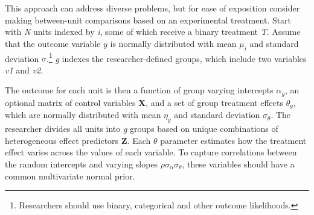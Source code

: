\documentclass[12pt]{article}
\begin{document}
This approach can address diverse problems, but for ease of exposition consider making between-unit comparisons based on an experimental treatment.    
Start with \textit{N} units indexed by \textit{i}, some of which receive a binary treatment \textit{T}.
Assume that the outcome variable ${y}$ is normally distributed with mean $\mu_i$ and standard deviation $\sigma$.\footnote{Researchers should use binary, categorical and other outcome likelihoods.}
\textit{g} indexes the researcher-defined groups, which include two variables \textit{v1} and \textit{v2}. 


The outcome for each unit is then a function of group varying intercepts $\alpha_g$, an optional matrix of control variables \textbf{X}, and a set of group treatment effects $\theta_g$, which are normally distributed with mean $\eta_g$ and standard deviation $\sigma_\theta$. 
The researcher divides all units into \textit{g} groups based on unique combinations of heterogeneous effect predictors \textbf{Z}. 
Each $\theta$ parameter estimates how the treatment effect varies across the values of  each variable.  
To capture correlations between the random intercepts and varying slopes $\rho \sigma_\alpha \sigma_\theta$, these variables should have a common multivariate normal prior.
\end{document}
